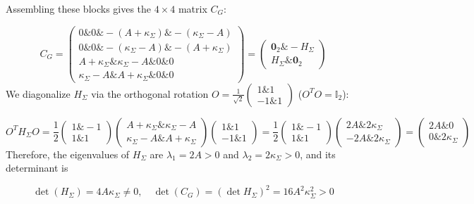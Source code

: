 \documentclass[aps,prd,onecolumn,superscriptaddress,nofootinbib,longbibliography,10pt]{revtex4-2}
\begin{document}
{{\begin{enumerate}
\end{enumerate}

  Assembling these blocks gives the \(4 \times 4\) matrix \(C_G\):


  \[ C_G = \begin{pmatrix} 0 \& 0 \& -(A + \kappa_\Sigma) \& -(\kappa_\Sigma - A) \\ 0 \& 0 \& -(\kappa_\Sigma - A) \& -(A + \kappa_\Sigma) \\ A + \kappa_\Sigma \& \kappa_\Sigma - A \& 0 \& 0 \\ \kappa_\Sigma - A \& A + \kappa_\Sigma \& 0 \& 0 \end{pmatrix} = \begin{pmatrix} \mathbf{0}_2 \& -H_\Sigma \\ H_\Sigma \& \mathbf{0}_2 \end{pmatrix} \]
  We diagonalize \(H_\Sigma\) via the orthogonal rotation \(O = \frac{1}{\sqrt{2}}\begin{pmatrix} 1 \& 1 \\ -1 \& 1 \end{pmatrix}\) (\(O^T O = \mathbb{I}_2\)):


  \[ O^T H_\Sigma O = \frac{1}{2}\begin{pmatrix} 1 \& -1 \\ 1 \& 1 \end{pmatrix}\begin{pmatrix} A + \kappa_\Sigma \& \kappa_\Sigma - A \\ \kappa_\Sigma - A \& A + \kappa_\Sigma \end{pmatrix}\begin{pmatrix} 1 \& 1 \\ -1 \& 1 \end{pmatrix} = \frac{1}{2}\begin{pmatrix} 1 \& -1 \\ 1 \& 1 \end{pmatrix}\begin{pmatrix} 2A \& 2\kappa_\Sigma \\ -2A \& 2\kappa_\Sigma \end{pmatrix} = \begin{pmatrix} 2A \& 0 \\ 0 \& 2\kappa_\Sigma \end{pmatrix} \]
  Therefore, the eigenvalues of \(H_\Sigma\) are \(\lambda_1 = 2A > 0\) and \(\lambda_2 = 2\kappa_\Sigma > 0\), and its determinant is


  \[ \det(H_\Sigma) = 4A\kappa_\Sigma \neq 0, \quad \det(C_G) = (\det H_\Sigma)^2 = 16A^2\kappa_\Sigma^2 > 0 \]

}}
\end{document}
